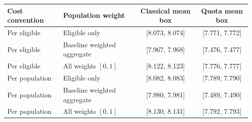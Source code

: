 \begin{tabular}{llcc}
\toprule
Cost convention & Population weight & Classical mean box & Quota mean box\\
\midrule
Per eligible & Eligible only & [8.073, 8.074] & [7.771, 7.772]\\
Per eligible & Baseline weighted aggregate & [7.967, 7.968] & [7.476, 7.477]\\
Per eligible & All weights $[0,1]$ & [8.122, 8.123] & [7.776, 7.777]\\
Per population & Eligible only & [8.082, 8.083] & [7.789, 7.790]\\
Per population & Baseline weighted aggregate & [7.980, 7.981] & [7.489, 7.490]\\
Per population & All weights $[0,1]$ & [8.130, 8.131] & [7.792, 7.793]\\
\bottomrule
\end{tabular}
